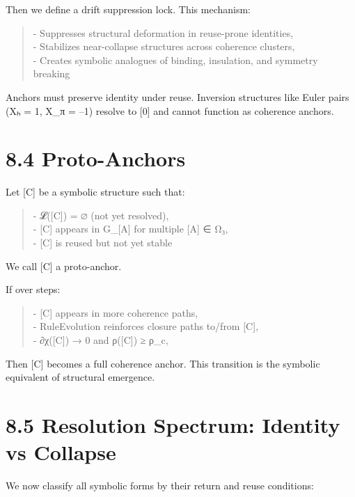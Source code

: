 Then we define a drift suppression lock. This mechanism:

\begin{quote}
- Suppresses structural deformation in reuse-prone identities,\\
- Stabilizes near-collapse structures across coherence clusters,\\
- Creates symbolic analogues of binding, insulation, and symmetry
breaking
\end{quote}

Anchors must preserve identity under reuse. Inversion structures like
Euler pairs (Xₕ = 1, X\_π = --1) resolve to {[}0{]} and cannot function
as coherence anchors.

\section{8.4 \textbar{} Proto-Anchors}\label{proto-anchors}

Let {[}C{]} be a symbolic structure such that:

\begin{quote}
- 𝓛({[}C{]}) = ∅ (not yet resolved),\\
- {[}C{]} appears in G\_{[}A{]} for multiple {[}A{]} ∈ Ω₃,\\
- {[}C{]} is reused but not yet stable
\end{quote}

We call {[}C{]} a proto-anchor.

If over steps:

\begin{quote}
- {[}C{]} appears in more coherence paths,\\
- RuleEvolution reinforces closure paths to/from {[}C{]},\\
- ∂χ({[}C{]}) → 0 and ρ({[}C{]}) ≥ ρ\_c,
\end{quote}

Then {[}C{]} becomes a full coherence anchor. This transition is the
symbolic equivalent of structural emergence.

\section{8.5 \textbar{} Resolution Spectrum: Identity vs
Collapse}\label{resolution-spectrum-identity-vs-collapse}

We now classify all symbolic forms by their return and reuse conditions:

